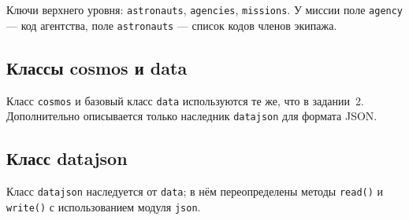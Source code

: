 \documentclass[a4paper,14pt]{extarticle}
\begin{document}
Ключи верхнего уровня: \texttt{astronauts}, \texttt{agencies}, \texttt{missions}. У миссии поле \texttt{agency} --- код агентства, поле \texttt{astronauts} --- список кодов членов экипажа.

\subsection{Классы cosmos и data}

Класс \texttt{cosmos} и базовый класс \texttt{data} используются те же, что в задании~2. Дополнительно описывается только наследник \texttt{datajson} для формата JSON.

\subsection{Класс datajson}

Класс \texttt{datajson} наследуется от \texttt{data}; в нём переопределены методы \texttt{read()} и \texttt{write()} с использованием модуля \texttt{json}.
\end{document}
